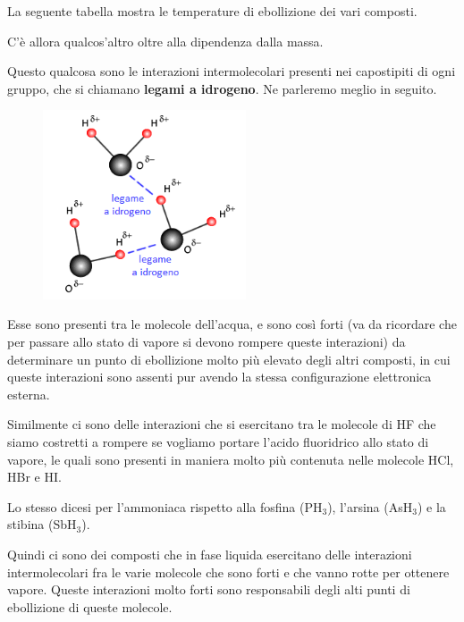 La seguente tabella mostra le temperature di ebollizione dei vari composti.

\vspace{0.2cm}C'è allora qualcos'altro oltre alla dipendenza dalla massa.

Questo qualcosa sono le interazioni intermolecolari presenti nei capostipiti di ogni gruppo, che si chiamano \textbf{legami a idrogeno}. Ne parleremo meglio in seguito.

\begin{minipage}{0.39 \textwidth}
    \begin{figure}[H]
        \includegraphics[width=6cm]{immagini/legame_a_idrogeno.png}
    \end{figure}
\end{minipage}
\begin{minipage}{0.6 \textwidth}
Esse sono presenti tra le molecole dell'acqua, e sono così forti (va da ricordare che per passare allo stato di vapore si devono rompere queste interazioni) da determinare un punto di ebollizione molto più elevato degli altri composti, in cui queste interazioni sono assenti pur avendo la stessa configurazione elettronica esterna.

Similmente ci sono delle interazioni che si esercitano tra le molecole di HF che siamo costretti a rompere se vogliamo portare l'acido fluoridrico allo stato di vapore, le quali sono presenti in maniera molto più contenuta nelle molecole HCl, HBr e HI.

Lo stesso dicesi per l'ammoniaca rispetto alla fosfina (PH$_3$), l'arsina (AsH$_3$) e la stibina (SbH$_3$).
\end{minipage}

\vspace{0.2cm}Quindi ci sono dei composti che in fase liquida esercitano delle interazioni intermolecolari fra le varie molecole che sono forti e che vanno rotte per ottenere vapore. Queste interazioni molto forti sono responsabili degli alti punti di ebollizione di queste molecole.